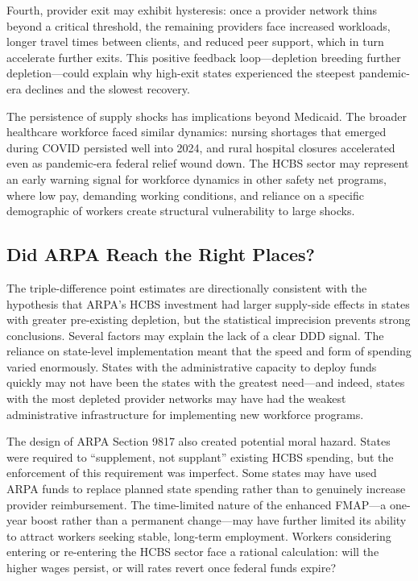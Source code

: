 \documentclass[12pt]{article}
\begin{document}
Fourth, provider exit may exhibit hysteresis: once a provider network thins beyond a critical threshold, the remaining providers face increased workloads, longer travel times between clients, and reduced peer support, which in turn accelerate further exits. This positive feedback loop---depletion breeding further depletion---could explain why high-exit states experienced the steepest pandemic-era declines and the slowest recovery.

The persistence of supply shocks has implications beyond Medicaid. The broader healthcare workforce faced similar dynamics: nursing shortages that emerged during COVID persisted well into 2024, and rural hospital closures accelerated even as pandemic-era federal relief wound down. The HCBS sector may represent an early warning signal for workforce dynamics in other safety net programs, where low pay, demanding working conditions, and reliance on a specific demographic of workers create structural vulnerability to large shocks.

\subsection{Did ARPA Reach the Right Places?}

The triple-difference point estimates are directionally consistent with the hypothesis that ARPA's HCBS investment had larger supply-side effects in states with greater pre-existing depletion, but the statistical imprecision prevents strong conclusions. Several factors may explain the lack of a clear DDD signal. The reliance on state-level implementation meant that the speed and form of spending varied enormously. States with the administrative capacity to deploy funds quickly may not have been the states with the greatest need---and indeed, states with the most depleted provider networks may have had the weakest administrative infrastructure for implementing new workforce programs.

The design of ARPA Section 9817 also created potential moral hazard. States were required to ``supplement, not supplant'' existing HCBS spending, but the enforcement of this requirement was imperfect. Some states may have used ARPA funds to replace planned state spending rather than to genuinely increase provider reimbursement. The time-limited nature of the enhanced FMAP---a one-year boost rather than a permanent change---may have further limited its ability to attract workers seeking stable, long-term employment. Workers considering entering or re-entering the HCBS sector face a rational calculation: will the higher wages persist, or will rates revert once federal funds expire?
\end{document}
